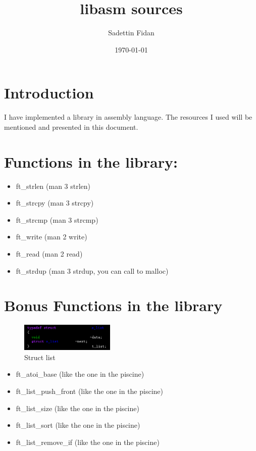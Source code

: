 \documentclass{article}
\title{libasm sources}
\author{Sadettin Fidan}
\date{\today}
\begin{document}
\maketitle

\section{Introduction}
I have implemented a library in assembly language. The resources I used will be mentioned and presented in this document.

\section{Functions in the library:}
\begin{itemize}
    \item ft\_strlen (man 3 strlen)
    \item ft\_strcpy (man 3 strcpy)
    \item ft\_strcmp (man 3 strcmp)
    \item ft\_write (man 2 write)
    \item ft\_read (man 2 read)
    \item ft\_strdup (man 3 strdup, you can call to malloc)
\end{itemize}

\section{Bonus Functions in the library}

\begin{figure}[H]
    \centering
    \includegraphics[width=0.4\textwidth]{struct_list.png}
    \caption{Struct list}
    \label{fig:struct_list}
\end{figure}

\begin{itemize}
    \item ft\_atoi\_base (like the one in the piscine)
    \item ft\_list\_push\_front (like the one in the piscine)
    \item ft\_list\_size (like the one in the piscine)
    \item ft\_list\_sort (like the one in the piscine)
    \item ft\_list\_remove\_if (like the one in the piscine)
\end{itemize}
\end{document}
